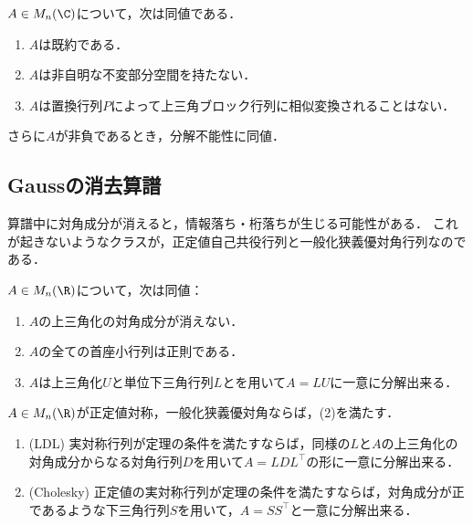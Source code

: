 \documentclass[uplatex, dvipdfmx]{jsreport}
\begin{document}
\begin{theorem}[既約性の幾何学的な意味]
    $A\in M_n(\C)$について，次は同値である．
    \begin{enumerate}
        \item $A$は既約である．
        \item $A$は非自明な不変部分空間を持たない．
        \item $A$は置換行列$P$によって上三角ブロック行列に相似変換されることはない．
    \end{enumerate}
    さらに$A$が非負であるとき，分解不能性に同値．
\end{theorem}

\subsection{Gaussの消去算譜}

\begin{tcolorbox}[colframe=ForestGreen, colback=ForestGreen!10!white,breakable,colbacktitle=ForestGreen!40!white,coltitle=black,fonttitle=\bfseries\sffamily,
title=]
    算譜中に対角成分が消えると，情報落ち・桁落ちが生じる可能性がある．
    これが起きないようなクラスが，正定値自己共役行列と一般化狭義優対角行列なのである．
\end{tcolorbox}

\begin{theorem}\label{thm-Gaussian-elimination}
    $A\in M_n(\R)$について，次は同値：
    \begin{enumerate}
        \item $A$の上三角化の対角成分が消えない．
        \item $A$の全ての首座小行列は正則である．
        \item $A$は上三角化$U$と単位下三角行列$L$とを用いて$A=LU$に一意に分解出来る．
    \end{enumerate}
\end{theorem}

\begin{proposition}
    $A\in M_n(\R)$が正定値対称，一般化狭義優対角ならば，(2)を満たす．
\end{proposition}

\begin{proposition}\mbox{}
    \begin{enumerate}
        \item (LDL) 実対称行列が定理の条件を満たすならば，同様の$L$と$A$の上三角化の対角成分からなる対角行列$D$を用いて$A=LDL^\top$の形に一意に分解出来る．
        \item (Cholesky) 正定値の実対称行列が定理の条件を満たすならば，対角成分が正であるような下三角行列$S$を用いて，$A=SS^\top$と一意に分解出来る．
    \end{enumerate}
\end{proposition}
\end{document}
